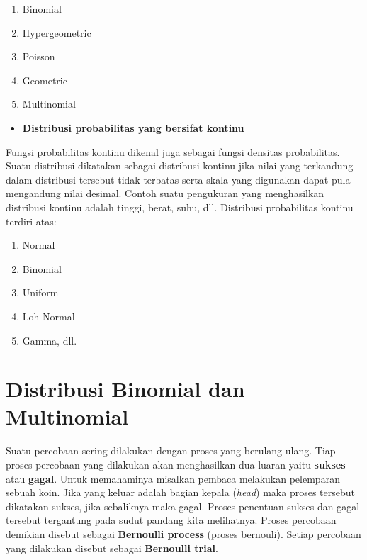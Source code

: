 \documentclass[]{book}
\providecommand{\tightlist}{%
  \setlength{\itemsep}{0pt}\setlength{\parskip}{0pt}}
\begin{document}
\begin{enumerate}
\def\labelenumi{\alph{enumi}.}
\tightlist
\item
  Binomial
\item
  Hypergeometric
\item
  Poisson
\item
  Geometric
\item
  Multinomial
\end{enumerate}

\begin{itemize}
\tightlist
\item
  \textbf{Distribusi probabilitas yang bersifat kontinu}
\end{itemize}

Fungsi probabilitas kontinu dikenal juga sebagai fungsi densitas
probabilitas. Suatu distribusi dikatakan sebagai distribusi kontinu jika
nilai yang terkandung dalam distribusi tersebut tidak terbatas serta
skala yang digunakan dapat pula mengandung nilai desimal. Contoh suatu
pengukuran yang menghasilkan distribusi kontinu adalah tinggi, berat,
suhu, dll. Distribusi probabilitas kontinu terdiri atas:

\begin{enumerate}
\def\labelenumi{\alph{enumi}.}
\tightlist
\item
  Normal
\item
  Binomial
\item
  Uniform
\item
  Loh Normal
\item
  Gamma, dll.
\end{enumerate}

\section{Distribusi Binomial dan
Multinomial}\label{distribusi-binomial-dan-multinomial}

Suatu percobaan sering dilakukan dengan proses yang berulang-ulang. Tiap
proses percobaan yang dilakukan akan menghasilkan dua luaran yaitu
\textbf{sukses} atau \textbf{gagal}. Untuk memahaminya misalkan pembaca
melakukan pelemparan sebuah koin. Jika yang keluar adalah bagian kepala
(\emph{head}) maka proses tersebut dikatakan sukses, jika sebaliknya
maka gagal. Proses penentuan sukses dan gagal tersebut tergantung pada
sudut pandang kita melihatnya. Proses percobaan demikian disebut sebagai
\textbf{Bernoulli process} (proses bernouli). Setiap percobaan yang
dilakukan disebut sebagai \textbf{Bernoulli trial}.
\end{document}
